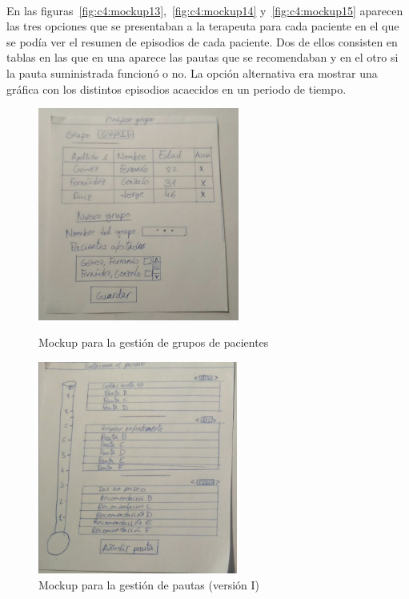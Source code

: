 \paragraph{}
En las figuras~\ref{fig:c4:mockup13},~\ref{fig:c4:mockup14} y~\ref{fig:c4:mockup15} aparecen las tres opciones que se presentaban a la terapeuta para cada paciente en el que se podía ver el resumen de episodios de cada paciente. Dos de ellos consisten en tablas en las que en una aparece las pautas que se recomendaban y en el otro si la pauta suministrada funcionó o no. La opción alternativa era mostrar una gráfica con los distintos episodios acaecidos en un periodo de tiempo.


\begin{figure}[h]
    \centering
    \begin{minipage}{.45\textwidth}
        \centering
        \includegraphics[width=0.8\linewidth, height=7cm]{Imagenes/anxA4.jpg}
        \caption[Mockup para la gestión de grupos de pacientes]{Mockup para la gestión de grupos de pacientes}
        \label{fig:c4:mockup9}
    \end{minipage}
    \hfill\vline\hfill
    \begin{minipage}{.45\textwidth}
        \centering
        \includegraphics[width=0.8\linewidth, height=7cm]{Imagenes/anxA5-1.png}
        \caption[Mockup para la gestión de pautas (versión I)]{Mockup para la gestión de pautas (versión I)}
        \label{fig:c4:mockup10}
    \end{minipage}
\end{figure}

